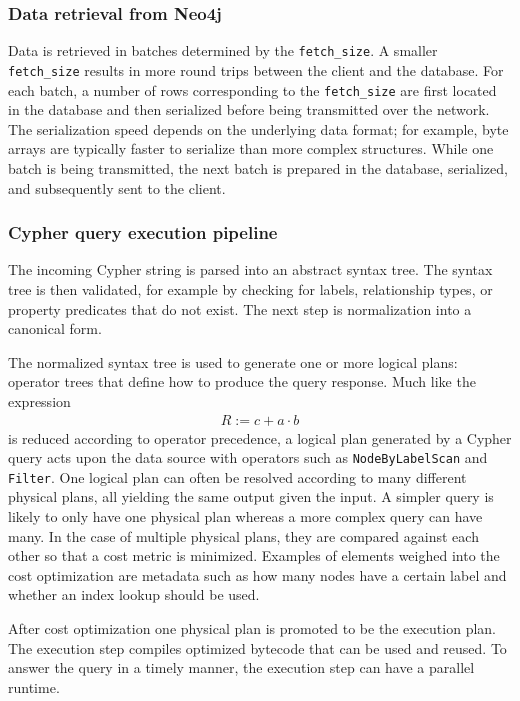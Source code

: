\documentclass[PhD]{uclathes}
\begin{document}
\subsubsection{Data retrieval from Neo4j}
Data is retrieved in batches determined by the \texttt{fetch\_size}. A smaller
\texttt{fetch\_size} results in more round trips between the client and the
database. For each batch, a number of rows corresponding to the
\texttt{fetch\_size} are first located in the database and then serialized
before being transmitted over the network. The serialization speed depends on
the underlying data format; for example, byte arrays are typically faster to
serialize than more complex structures. While one batch is being transmitted,
the next batch is prepared in the database, serialized, and subsequently sent
to the client.

\subsubsection{Cypher query execution pipeline}
The incoming Cypher string is parsed into an abstract syntax tree. The syntax
tree is then validated, for example by checking for labels, relationship types,
or property predicates that do not exist. The next step is normalization into a
canonical form.

The normalized syntax tree is used to generate one or more logical plans:
operator trees that define how to produce the query response. Much like the
expression
\begin{align*}
    R := c + a \cdot b
\end{align*}
is reduced according to operator precedence, a logical plan generated by a
Cypher query acts upon the data source with operators such as
\texttt{NodeByLabelScan} and \texttt{Filter}. One logical plan can often be
resolved according to many different physical plans, all yielding the same
output given the input. A simpler query is likely to only have one physical
plan whereas a more complex query can have many. In the case of multiple
physical plans, they are compared against each other so that a cost metric is
minimized. Examples of elements weighed into the cost optimization are metadata
such as how many nodes have a certain label and whether an index lookup should
be used.

After cost optimization one physical plan is promoted to be the execution plan.
The execution step compiles optimized bytecode that can be used and reused. To
answer the query in a timely manner, the execution step can have a parallel
runtime.
\end{document}

